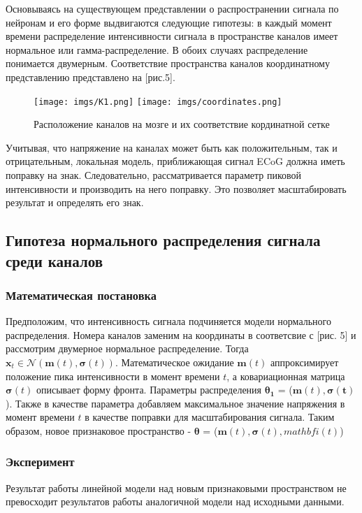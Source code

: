 \documentclass{mipt-thesis-bs}
\begin{document}
Основываясь на существующем представлении о распространении сигнала по нейронам и его форме выдвигаются следующие гипотезы: в каждый момент времени распределение интенсивности сигнала в пространстве каналов имеет нормальное или гамма-распределение. В обоих случаях распределение понимается двумерным. Соответствие пространства каналов координатному представлению представлено на [рис.5]. 
\begin{figure}[h]
\begin{center}
	\texttt{[image: imgs/K1.png]}
	\hspace{1 cm}
	\texttt{[image: imgs/coordinates.png]}
	
	\caption{Расположение каналов на мозге и их соответствие кординатной сетке}	
	\label{fig:channels}
\end{center}
\end{figure}
	
	Учитывая, что напряжение на каналах может быть как положительным, так и отрицательным, локальная модель, приближающая сигнал ECoG должна иметь поправку на знак. Следовательно, рассматривается параметр пиковой интенсивности и производить на него поправку. Это позволяет масштабировать результат и определять его знак. 
	
\subsection{Гипотеза нормального распределения сигнала среди каналов}
\subsubsection{Математическая постановка} 
Предположим, что интенсивность сигнала подчиняется модели нормального распределения. Номера каналов заменим на координаты в соответсвие с [рис. 5] и рассмотрим двумерное нормальное распределение. Тогда $\mathbf{x}_t \in \mathcal{N}(\mathbf{m}(t),\mathbf{\sigma}(t))$. Математическое ожидание $\mathbf{m}(t)$ аппроксимирует положение пика интенсивности в момент времени $t$, а ковариационная матрица $\mathbf{\sigma}(t)$ описывает форму фронта. Параметры распределения $\mathbf{\theta_1}$ = ($\mathbf{m}(t), \mathbf{\sigma(t)}$). Также в качестве параметра добавляем максимальное значение напряжения в момент времени $t$ в качестве поправки для масштабирования сигнала. Таким образом, новое признаковое пространство - $\mathbf{\theta}$ = ($\mathbf{m}(t), \mathbf{\sigma}(t), mathbf{i}(t)$)

\subsubsection{Эксперимент}
Результат работы линейной модели над новым признаковыми пространством не превосходит результатов работы аналогичной модели над исходными данными.
\end{document}
